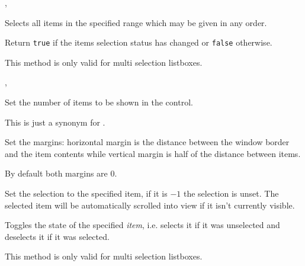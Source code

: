 , 


\label{wxvlistboxselectrange}


Selects all items in the specified range which may be given in any order.

Return {\tt true} if the items selection status has changed or {\tt false}
otherwise.

This method is only valid for multi selection listboxes.


, 



Set the number of items to be shown in the control.

This is just a synonym for
.


\label{wxvlistboxsetmargins}



Set the margins: horizontal margin is the distance between the window
border and the item contents while vertical margin is half of the
distance between items.

By default both margins are $0$.


\label{wxvlistboxsetselection}


Set the selection to the specified item, if it is $-1$ the selection is
unset. The selected item will be automatically scrolled into view if it isn't
currently visible.


\label{wxvlistboxtoggle}


Toggles the state of the specified {\it item}, i.e. selects it if it was
unselected and deselects it if it was selected.

This method is only valid for multi selection listboxes.



